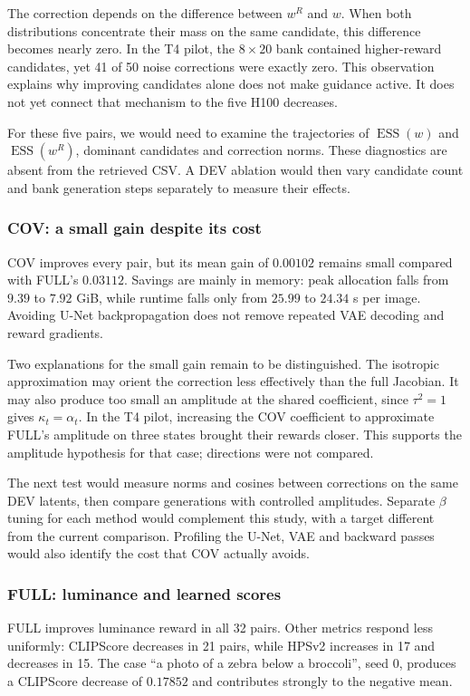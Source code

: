 \documentclass[11pt,a4paper]{article}
\newcommand{\ESS}{\operatorname{ESS}}
\begin{document}
The correction depends on the difference between $w^R$ and $w$. When both distributions concentrate their mass on the same candidate, this difference becomes nearly zero. In the T4 pilot, the $8\times20$ bank contained higher-reward candidates, yet 41 of 50 noise corrections were exactly zero. This observation explains why improving candidates alone does not make guidance active. It does not yet connect that mechanism to the five H100 decreases.

For these five pairs, we would need to examine the trajectories of $\ESS(w)$ and $\ESS(w^R)$, dominant candidates and correction norms. These diagnostics are absent from the retrieved CSV. A DEV ablation would then vary candidate count and bank generation steps separately to measure their effects.

\subsubsection*{COV: a small gain despite its cost}
COV improves every pair, but its mean gain of $0.00102$ remains small compared with FULL's $0.03112$. Savings are mainly in memory: peak allocation falls from $9.39$ to $7.92$ GiB, while runtime falls only from $25.99$ to $24.34$ s per image. Avoiding U-Net backpropagation does not remove repeated VAE decoding and reward gradients.

Two explanations for the small gain remain to be distinguished. The isotropic approximation may orient the correction less effectively than the full Jacobian. It may also produce too small an amplitude at the shared coefficient, since $\tau^2=1$ gives $\kappa_t=\alpha_t$. In the T4 pilot, increasing the COV coefficient to approximate FULL's amplitude on three states brought their rewards closer. This supports the amplitude hypothesis for that case; directions were not compared.

The next test would measure norms and cosines between corrections on the same DEV latents, then compare generations with controlled amplitudes. Separate $\beta$ tuning for each method would complement this study, with a target different from the current comparison. Profiling the U-Net, VAE and backward passes would also identify the cost that COV actually avoids.

\subsubsection*{FULL: luminance and learned scores}
FULL improves luminance reward in all 32 pairs. Other metrics respond less uniformly: CLIPScore decreases in 21 pairs, while HPSv2 increases in 17 and decreases in 15. The case ``a photo of a zebra below a broccoli'', seed 0, produces a CLIPScore decrease of $0.17852$ and contributes strongly to the negative mean.
\end{document}
